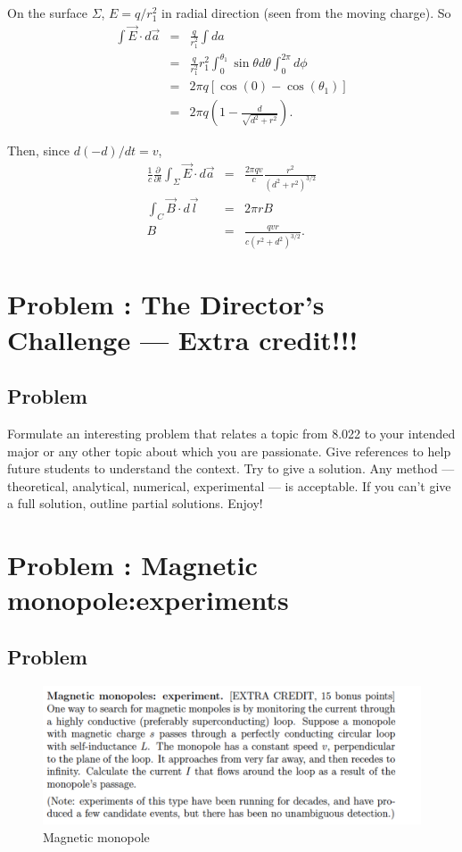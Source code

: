 \documentclass[solutions]{esg8022pset}
\begin{document}
On the surface $\Sigma$, $E=q/r_1^2$ in radial direction (seen from
the moving charge).  So
\begin{eqnarray}
\int \vec{E}\cdot d\vec{a} &=& \frac{q}{r_1^2}\int da\nonumber\\
&=& \frac{q}{r_1^2}r_1^2\int_{0}^{\theta_1}\sin\theta d\theta
\int_0^{2\pi}d\phi\nonumber\\
&=& 2\pi q\left[\cos(0) - \cos(\theta_1)\right]\nonumber\\
&=& 2\pi q(1-\frac{d}{\sqrt{d^2+r^2}}).
\end{eqnarray}

Then, since $d(-d)/dt=v$,
\begin{eqnarray}
\frac{1}{c}\frac{\partial}{\partial t}\int_{\Sigma} \vec{E}\cdot
d\vec{a} &=& \frac{2\pi qv}{c}\frac{r^2}{(d^2+r^2)^{3/2}}\\
\int_C \vec{B}\cdot d\vec{l} &=& 2\pi rB\\
B&=& \frac{qvr}{c(r^2+d^2)^{3/2}}.
\end{eqnarray}


\section{Problem \thesection: The Director's Challenge --- Extra credit!!!}
\subsection{Problem}
  Formulate an interesting problem that relates a topic from 8.022 to your
  intended major or any other topic about which you are passionate.  Give references
  to help future students to understand the context.  Try to give a solution.
  Any method --- theoretical, analytical, numerical, experimental --- is acceptable.
  If you can't give a full solution, outline partial solutions. Enjoy!
\section{Problem \thesection: Magnetic monopole:experiments}
\subsection{Problem}

 \begin{figure}[H]
    \centering
    \includegraphics[width = 15cm]{monopoles}
    \caption{Magnetic monopole}
  \end{figure}
\end{document}
